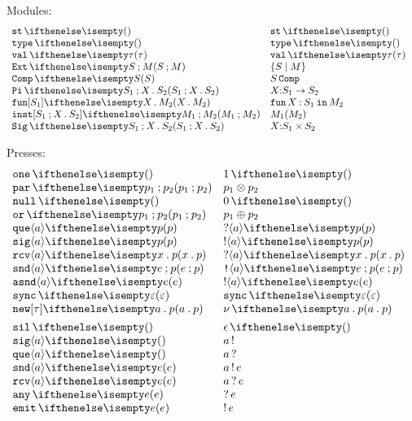 \documentclass[11pt,twoside]{article}
\begin{document}
\noindent Modules:
\begin{displaymath}
  \begin{array}{l@{\quad}l@{\quad}l}
    \staticLock & \staticLock* \\
    \univSg  & \univSg* \\
    \valSg{\tau} & \valSg*{\tau} \\
    \extSg{S}{M} & \extSg*{S}{M} \\
    \compSg{S}  & \compSg*{S} \\
    \piSg{S_1}{X}{S_2} & \piSg*{S_1}{X}{S_2} \\
    \funMd{S_1}{X}{M_2} & \funMd*{S_1}{X}{M_2} \\
    \instMd[S_1][X][S_2]{M_1}{M_2} & \instMd*{M_1}{M_2} \\
    \sigSg{S_1}{X}{S_2} & \sigSg*{S_1}{X}{S_2}
  \end{array}
\end{displaymath}

\noindent Presses:
\begin{displaymath}
  \begin{array}{l@{\quad}l@{\quad}l}
    \unitPr{}    & \unitPr*{} \\
    \parPr{p_1}{p_2} & \parPr*{p_1}{p_2} \\
    \nullPr{} & \nullPr*{} \\
    \orPr{p_1}{p_2}  & \orPr*{p_1}{p_2} \\
    \quePr{a}{p} & \quePr*{a}{p} \\
    \sigPr{a}{p}  & \sigPr*{a}{p} \\
    \rcvPr{a}{x}{p} & \rcvPr*{a}{x}{p} \\
    \sndPr{a}{e}{p} & \sndPr*{a}{e}{p} \\
    \asndPr{a}{e} & \asndPr*{a}{e} \\
    \syncPr{\varepsilon} & \syncPr*{\varepsilon} \\
    \newPr{a}{p} & \newPr*{a}{p} \\[1ex]
    \silAc & \silAc* \\
    \sigAc{a} & \sigAc*{a} \\
    \queAc{a}  & \queAc*{a} \\
    \sndAc{a}{e} & \sndAc*{a}{e} \\
    \rcvAc{a}{e} & \rcvAc*{a}{e} \\
    \anyAc{e}  & \anyAc*{e} \\
    \emitAc{e} & \emitAc*{e}
  \end{array}
\end{displaymath}
\end{document}

